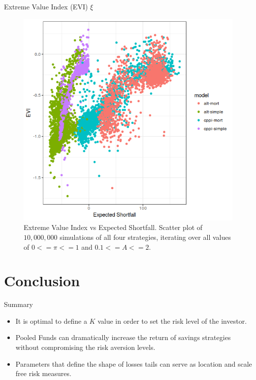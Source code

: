 \documentclass[10pt]{beamer}
\begin{document}
\begin{frame}[fragile]{Extreme Value Index (EVI) $\xi$}
  \begin{figure}[h]
    \centering
    \includegraphics[scale=0.45]{evi-es_new2.png}
    \caption{Extreme Value Index vs Expected Shortfall. Scatter plot of $10,000,000$ simulations of all four strategies, iterating over all values of $0 <= \pi <= 1$ and $0.1 <= A <= 2$.}
    \label{fig:evi-es}
  \end{figure}
\end{frame}

\section{Conclusion}

\begin{frame}[fragile]{Summary}
  \begin{itemize}
    \item It is optimal to define a $K$ value in order to set the risk level of the investor.
    \item Pooled Funds can dramatically increase the return of savings strategies without compromising the risk aversion levels.
    \item Parameters that define the shape of losses tails can serve as location and scale free risk measures.
  \end{itemize}
\end{frame}
\end{document}
